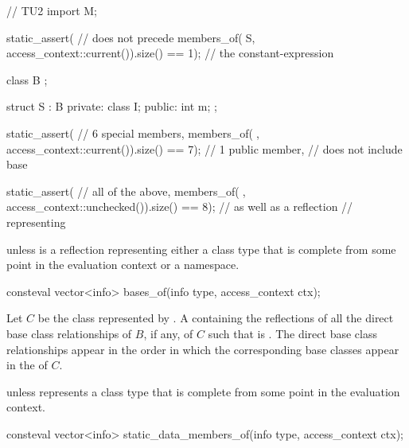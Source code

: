\begin{itemdescr}
\begin{example}
\begin{codeblock}
// TU2
import M;

static_assert(                                                  //  does not precede
  members_of(^^NS, access_context::current()).size() == 1);     // the constant-expression

class B {};

struct S : B {
private:
  class I;
public:
  int m;
};

static_assert(                                                  // 6 special members,
  members_of(^^S, access_context::current()).size() == 7);      // 1 public member,
                                                                // does not include base

static_assert(                                                  // all of the above,
  members_of(^^S, access_context::unchecked()).size() == 8);    // as well as a reflection
                                                                // representing 
\end{codeblock}
\end{example}

\pnum
\throws
{} unless
 is a reflection representing either
a class type that is complete from some point in the evaluation context
or a namespace.
\end{itemdescr}

%
\begin{itemdecl}
consteval vector<info> bases_of(info type, access_context ctx);
\end{itemdecl}

\begin{itemdescr}
\pnum
\returns
Let $C$ be the class represented by .
A  containing the reflections
of all the direct base class relationships of $B$, if any,
of $C$ such that  is .
The direct base class relationships appear in the order in which
the corresponding base classes appear in the  of $C$.

\pnum
\throws
{} unless
 represents a class type
that is complete from some point in the evaluation context.
\end{itemdescr}

%
\begin{itemdecl}
consteval vector<info> static_data_members_of(info type, access_context ctx);
\end{itemdecl}


